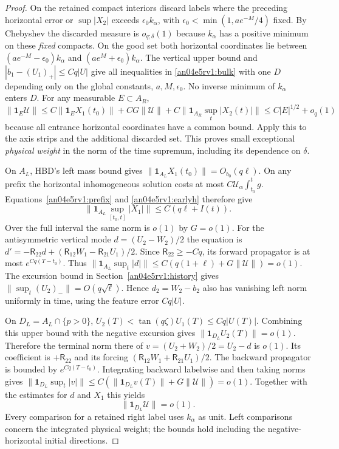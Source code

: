 \documentclass[11pt]{article}
\begin{document}
\begin{proof}
On the retained compact interiors discard labels where the preceding horizontal error or $\sup |X_2|$ exceeds $\epsilon_0 k_\alpha$, with $\epsilon_0<\min(1,a e^{-M}/4)$ fixed. By Chebyshev the discarded measure is $o_{q;\delta}(1)$ because $k_\alpha$ has a positive minimum on these \emph{fixed} compacts. On the good set both horizontal coordinates lie between $(a e^{-M}-\epsilon_0)k_\alpha$ and $(a e^M+\epsilon_0)k_\alpha$. The vertical upper bound and $|b_1-(U_1)_+|\le Cq|U|$ give all inequalities in \eqref{an04e5rv1:bulk} with one $D$ depending only on the global constants, $a,M,\epsilon_0$. No inverse minimum of $k_\alpha$ enters $D$. For any measurable $E\subset A_R$,
\[
 \|\mathbf1_E\mathcal U\|\le C\|\mathbf1_E X_1(t_0)\|+
 C G\|\mathcal U\|+C\|\mathbf1_{A_R}\sup_t |X_2(t)|\|
 \le C |E|^{1/2}+o_q(1)
\]
because all entrance horizontal coordinates have a common bound. Apply this to the axis strips and the additional discarded set. This proves small exceptional \emph{physical weight} in the norm of the time supremum, including its dependence on $\delta$.

On $A_L$, HBD's left mass bound gives $\|\mathbf1_{A_L}X_1(t_0)\|=O_{b_0}(q\ell)$. On any prefix the horizontal inhomogeneous solution costs at most $C\mathcal U_\alpha\int_{t_0}^t g$. Equations~\eqref{an04e5rv1:prefix} and \eqref{an04e5rv1:earlyh} therefore give
\begin{equation}\label{an04e5rv1:left}
 \|\mathbf1_{A_L}\sup_{[t_0,t]} |X_1|\|\le C(q\ell+I(t)).
\end{equation}
Over the full interval the same norm is $o(1)$ by $G=o(1)$. For the antisymmetric vertical mode $d=(U_2-W_2)/2$ the equation is $d'=-\mathsf R_{22}d+(\mathsf R_{12} W_1-\mathsf R_{21}U_1)/2$. Since $\mathsf R_{22}\ge-Cq$, its forward propagator is at most $e^{Cq(T-t_0)}$. Thus $\|\mathbf1_{A_L}\sup_t|d|\|\le C(q(1+\ell)+G\|\mathcal U\|)=o(1)$. The excursion bound in Section~\ref{an04e5rv1:history} gives $\|\sup_t (U_2)_-\|=O(q\sqrt\ell)$. Hence $d_2=W_2-b_2$ also has vanishing left norm uniformly in time, using the feature error $Cq|U|$.

On $D_L=A_L\cap\{p>0\}$, $U_2(T)<\tan(q\zeta) U_1(T)\le Cq|U(T)|$. Combining this upper bound with the negative excursion gives $\|\mathbf1_{D_L}U_2(T)\|=o(1)$. Therefore the terminal norm there of $v=(U_2+W_2)/2=U_2-d$ is $o(1)$. Its coefficient is $+\mathsf R_{22}$ and its forcing $(\mathsf R_{12}W_1+\mathsf R_{21}U_1)/2$. The backward propagator is bounded by $e^{Cq(T-t_0)}$. Integrating backward labelwise and then taking norms gives $\|\mathbf1_{D_L}\sup_t|v|\|\le C(\|\mathbf1_{D_L}v(T)\|+G\|\mathcal U\|)=o(1)$. Together with the estimates for $d$ and $X_1$ this yields
\begin{equation}\label{an04e5rv1:activeleft}
 \|\mathbf1_{D_L}\mathcal U\|=o(1).
\end{equation}
Every comparison for a retained right label uses $k_\alpha$ as unit. Left comparisons concern the integrated physical weight; the bounds hold including the negative-horizontal initial directions.
\end{proof}
\end{document}
